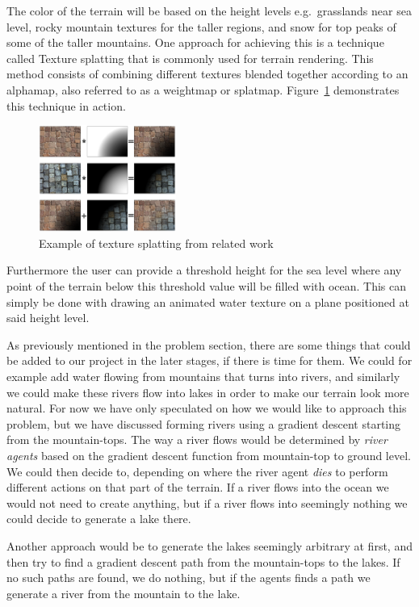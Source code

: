 The color of the terrain will be based on the height levels e.g.\ grasslands near sea level, rocky mountain textures for the taller regions, and snow for top peaks of some of the taller mountains.
One approach for achieving this is a technique called Texture splatting that is commonly used for terrain rendering.
This method consists of combining different textures blended together according to an alphamap, also referred to as a weightmap or splatmap.
Figure~\ref{fig:texture-splatting} demonstrates this technique in action.

\begin{figure}[H]
  \centering
  \includegraphics[width=0.4\textwidth]{figure/texture-splatting.png}
  \caption{Example of texture splatting from related work \cite{wiki:texture-splatting-img}}
  \label{fig:texture-splatting}
\end{figure}

Furthermore the user can provide a threshold height for the sea level where any point of the terrain below this threshold value will be filled with ocean. 
This can simply be done with drawing an animated water texture on a plane positioned at said height level. 

As previously mentioned in the problem section, there are some things that could be added to our project in the later stages, if there is time for them. 
We could for example add water flowing from mountains that turns into rivers, and similarly we could make these rivers flow into lakes in order to make our terrain look more natural.
For now we have only speculated on how we would like to approach this problem, but we have discussed forming rivers using a gradient descent starting from the mountain-tops.
The way a river flows would be determined by \textit{river agents} based on the gradient descent function from mountain-top to ground level. 
We could then decide to, depending on where the river agent \textit{dies}  to perform different actions on that part of the terrain.
If a river flows into the ocean we would not need to create anything, but if a river flows into seemingly nothing we could decide to generate a lake there. 

Another approach would be to generate the lakes seemingly arbitrary at first, and then try to find a gradient descent path from the mountain-tops to the lakes.
If no such paths are found, we do nothing, but if the agents finds a path we generate a river from the mountain to the lake. 



